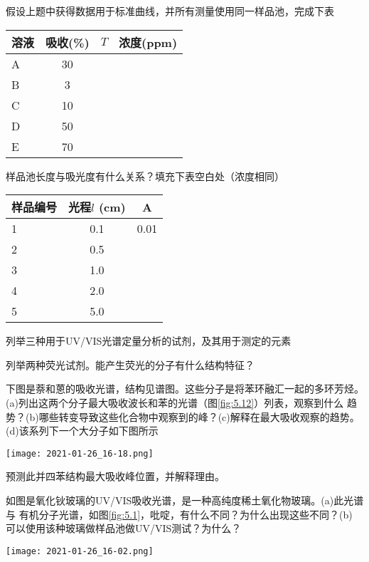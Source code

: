 \begin{problemset}
\item 假设上题中获得数据用于标准曲线，并所有测量使用同一样品池，完成下表
    \begin{center}
        \begin{tabular}{lcp{2cm}p{2cm}}
            \hline
            溶液 & 吸收(\%) & \qquad$T$ & 浓度(ppm)\\
            \hline
            A & 30 & & \\
            B & 3 & & \\
            C & 10 & & \\
            D & 50 & & \\
            E & 70 & & \\
            \hline
        \end{tabular}
    \end{center}
\item 样品池长度与吸光度有什么关系？填充下表空白处（浓度相同）
    \begin{center}
        \begin{tabular}{lcc}
            \hline
            样品编号 & 光程$l$ (cm) & A \\
            \hline
            1 & 0.1  & 0.01 \\
            2 & 0.5  & \\
            3 & 1.0  & \\
            4 & 2.0  & \\
            5 & 5.0  & \\
            \hline
        \end{tabular}
    \end{center}
\item 列举三种用于UV/VIS光谱定量分析的试剂，及其用于测定的元素
\item 列举两种荧光试剂。能产生荧光的分子有什么结构特征？
\item 下图是萘和蒽的吸收光谱，结构见谱图。这些分子是将苯环融汇一起的多环芳烃。
    (a)列出这两个分子最大吸收波长和苯的光谱（图\ref{fig:5.12}）列表，观察到什么
    趋势？(b)哪些转变导致这些化合物中观察到的峰？(c)解释在最大吸收观察的趋势。
    (d)该系列下一个大分子如下图所示
    \begin{center}
        \texttt{[image: 2021-01-26\_16-18.png]}
    \end{center}
    预测此并四苯结构最大吸收峰位置，并解释理由。
\item 如图是氧化钬玻璃的UV/VIS吸收光谱，是一种高纯度稀土氧化物玻璃。(a)此光谱与
    有机分子光谱，如图\ref{fig:5.1}，吡啶，有什么不同？为什么出现这些不同？(b)
    可以使用该种玻璃做样品池做UV/VIS测试？为什么？
    \begin{center}
        \texttt{[image: 2021-01-26\_16-02.png]}
    \end{center}
\end{problemset}
